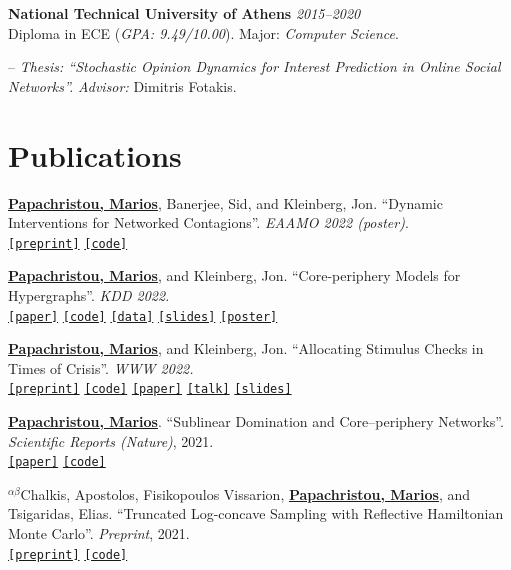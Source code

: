 \documentclass[margin]{res}
\newcommand{\field}[2]{\noindent \textbf{#1} \hfill #2 \\}
\newcommand{\alphabeticalorder}[0]{\ensuremath {^{\alpha \beta}}}
\newcommand{\specialurl}[2]{\href {#2} {\texttt{[#1]}}}
\newcommand{\preprint}[1]{\specialurl {preprint} {#1}}
\newcommand{\code}[1]{\specialurl {code} {#1}}
\newcommand{\data}[1]{\specialurl {data} {#1}}
\newcommand{\talk}[1]{\specialurl {talk} {#1}}
\newcommand{\slides}[1]{\specialurl {slides} {#1}}
\newcommand{\poster}[1]{\specialurl {poster} {#1}}
\newcommand{\paper}[1]{\specialurl {paper} {#1}}
\newcommand{\authorref}[1]{\underline {\textbf{#1}}}
\newcommand{\authorme}{\authorref{Papachristou, Marios}}
\begin{document}
\begin{resume}
\field{National Technical University of Athens}  {\emph{2015--2020}} 
Diploma in ECE (\emph{GPA: 9.49/10.00}). Major: \emph{Computer Science}.
\begin{compactitem}
\item[--] \emph{Thesis: ``Stochastic Opinion Dynamics for Interest Prediction in Online Social Networks''.} \emph{Advisor:} Dimitris Fotakis.

\end{compactitem} 

\section{Publications}

\begin{compactenum}
   \item \authorme, Banerjee, Sid, and Kleinberg, Jon. ``Dynamic Interventions for Networked Contagions''. \emph{EAAMO 2022 (poster)}. \\
		\preprint{https://arxiv.org/abs/2205.13394} \code{https://github.com/papachristoumarios/dynamic-clearing}
   \item \authorme, and Kleinberg, Jon. ``Core-periphery Models for Hypergraphs''. \emph{KDD 2022.} \\
   \paper{https://arxiv.org/abs/2206.00783} \code{https://doi.org/10.5281/zenodo.5965849} \data{https://doi.org/10.5281/zenodo.5943043} \slides{https://drive.google.com/file/d/1k9pjPaeDtg7jhUivjlEmyunimcUb-DxL/view?usp=sharing} \poster{https://drive.google.com/file/d/1RJ3C7KKhTemfj5OBAiEXUHMVp-TJhTDs/view?usp=sharing}
   \item  \authorme, and Kleinberg, Jon. ``Allocating Stimulus Checks in Times of Crisis''. \emph{WWW 2022.} \\\preprint{https://arxiv.org/abs/2106.07560} \code{https://github.com/papachristoumarios/financial-contagion} \paper{https://doi.org/10.1145/3485447.3512047} \talk{https://youtu.be/WUmPBztK8Mo} \slides{https://drive.google.com/file/d/1v4v4jPOTzFtP8a5dhAFLoIjZSRDxAjBz/view?usp=sharing}    
   \item \authorme. ``Sublinear Domination and Core--periphery Networks''. \emph{Scientific Reports (Nature)}, 2021. \\ \paper{http://www.nature.com/articles/s41598-021-94105-8} \code{https://bit.ly/3wKNGI0} 
    \item \alphabeticalorder Chalkis, Apostolos, Fisikopoulos Vissarion, \authorme, and Tsigaridas, Elias. ``Truncated Log-concave Sampling with Reflective Hamiltonian Monte Carlo''.  \emph{Preprint}, 2021. \\ \preprint{https://arxiv.org/abs/2102.13068} \code{https://github.com/GeomScale/volume_approximation}

\end{compactenum}
\end{resume}
\end{document}
